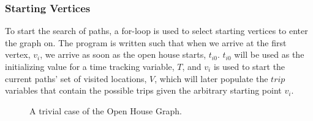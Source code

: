 \documentclass[letterpaper,11pt]{report}
\theoremstyle{definition}
\theoremstyle{definition}
\begin{document}
\subsubsection{Starting Vertices}
To start the search of paths, a for-loop is used to select starting vertices to enter the graph on. The program is written such that when we arrive at the first vertex, $v_i$, we arrive as soon as the open house starts, $t_{i0}$. $t_{i0}$ will be used as the initializing value for a time tracking variable, $T$, and $v_i$ is used to start the current paths' set of visited locations, $V$, which will later populate the $trip$ variables that contain the possible trips given the arbitrary starting point $v_i$.
\begin{figure}[!htb]
  \begin{center}
      
      \caption{A trivial case of the Open House Graph.}\label{trivial-graph}
    \end{center}
\end{figure}
\end{document}
